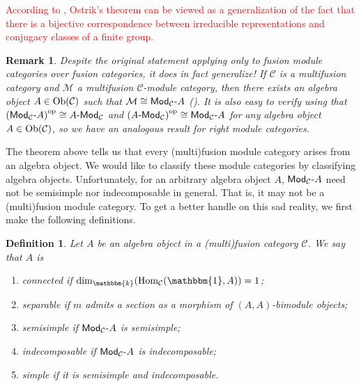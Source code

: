 \documentclass[12pt, reqno]{amsart}
\numberwithin{equation}{section}
\theoremstyle{plainspace}
\theoremstyle{definitionspace}
\newtheorem{definition}[theorem]{Definition}
\theoremstyle{remarkspace}
\newtheorem{remark}[theorem]{Remark}
\newcommand{\mathcat}[1]{\mathcal{#1}}
\newcommand{\Ob}{\textup{Ob}}
\newcommand{\Hom}[2][]{
	\ifthenelse{\equal{#2}{}}
		{\textup{Hom}_{#1}}
		{\textup{Hom}_{#1}\!\left(#2\right)}
}
\newcommand{\opcat}[1]{{#1}^{\textup{op}}}
\newcommand{\textcat}[1]{\textup{\textsf{#1}}}
\newcommand{\rmodcat}[2][]{\textcat{Mod}_{#1}\textcat{-}#2}
\newcommand{\lmodcat}[2][]{#2\textcat{-Mod}_{#1}}
\begin{document}
\noindent \textcolor{red}{According to \cite{Mackaay_2019}, Ostrik's theorem can be viewed as a generalization of the fact that there is a bijective correspondence between irreducible representations and conjugacy classes of a finite group.}
\newline

\begin{remark}\label{rem:modules_from_algebras}
Despite the original statement applying only to fusion module categories over fusion categories, it does in fact generalize! If $\mathcat{C}$ is a multifusion category and $\mathcat{M}$ a multifusion $\mathcat{C}$-module category, then there exists an algebra object $A \in \Ob(\mathcat{C})$ such that $\mathcat{M} \cong \rmodcat[\mathcat{C}]{A}$ (\cite[Corollary 7.10.5]{Etingof_2016}). It is also easy to verify using \cite[Proposition 7.1.6]{Etingof_2016} that $\opcat{(\rmodcat[\mathcat{C}]{A})} \cong \lmodcat[\mathcat{C}]{A}$ and $\opcat{(\lmodcat[\mathcat{C}]{A})} \cong \rmodcat[\mathcat{C}]{A}$ for any algebra object $A \in \Ob(\mathcat{C})$, so we have an analogous result for right module categories.
\end{remark}
\leavevmode

\noindent The theorem above tells us that every (multi)fusion module category arises from an algebra object. We would like to classify these module categories by classifying algebra objects. Unfortunately, for an arbitrary algebra object $A$, $\rmodcat[\mathcat{C}]{A}$ need not be semisimple nor indecomposable in general. That is, it may not be a (multi)fusion module category. To get a better handle on this sad reality, we first make the following definitions.
\newline

\begin{definition}\label{def:algebra_object_notation}
Let $A$ be an algebra object in a (multi)fusion category $\mathcat{C}$. We say that $A$ is
\begin{enumerate}[start=1, leftmargin=1.5cm, label={(\arabic*).}]
\item {\em connected} if $\dim_{\mathbbm{k}}(\Hom[\mathcat{C}]{\mathbbm{1}, A}) = 1$;
\item {\em separable} if $m$ admits a section as a morphism of $(A, A)$-bimodule objects;
\item {\em semisimple} if $\rmodcat[\mathcat{C}]{A}$ is semisimple;
\item {\em indecomposable} if $\rmodcat[\mathcat{C}]{A}$ is indecomposable;
\item {\em simple} if it is semisimple and indecomposable.
\end{enumerate}
\end{definition}
\leavevmode
\end{document}
